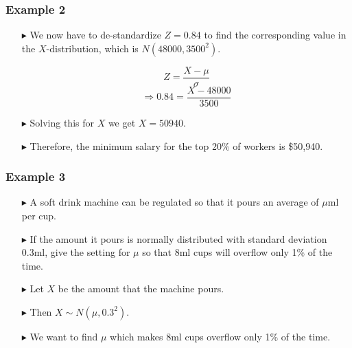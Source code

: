 \documentclass[12pt]{beamer}
\begin{document}
\begin{frame}
	\frametitle{Example 2}
	
	\begin{itemize}
		\item[\color{blue}$\blacktriangleright$] We now have to de-standardize $Z = 0.84$ to find the 
		corresponding value in the $X$-distribution, which is 
		$N(48000, 3500^2)$.
		
		\vspace{0.5em}
		\[
		Z = \frac{X - \mu}{\sigma}
		\]
		\[
		\Rightarrow 0.84 = \frac{X - 48000}{3500}
		\]
		\vspace{0.5em}
		
		\item[\color{blue}$\blacktriangleright$] Solving this for $X$ we get $X = 50940$.
		
		\item[\color{blue}$\blacktriangleright$] Therefore, the minimum salary for the top 20\% of 
		workers is \$50,940.
	\end{itemize}
	
\end{frame}
\begin{frame}
	\frametitle{Example 3}
	
	\begin{itemize}
		\item[\color{blue}$\blacktriangleright$] A soft drink machine can be regulated so that it 
		pours an average of $\mu$ml per cup.
		
		\item[\color{blue}$\blacktriangleright$] If the amount it pours is normally distributed with 
		standard deviation 0.3ml, give the setting for $\mu$ so 
		that 8ml cups will overflow only 1\% of the time.
		
		\item[\color{blue}$\blacktriangleright$] Let $X$ be the amount that the machine pours.
		
		\item[\color{blue}$\blacktriangleright$] Then $X \sim N(\mu, 0.3^2)$.
		
		\item[\color{blue}$\blacktriangleright$] We want to find $\mu$ which makes 8ml cups overflow 
		only 1\% of the time.
	\end{itemize}
	
	\end{frame}
\end{document}
